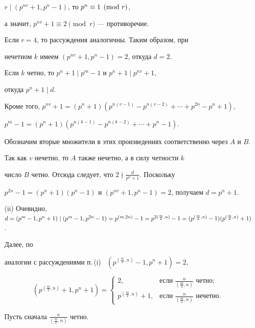 $r\mid(p^{nv}+1,p^n-1)$, то $p^n\equiv\linebreak 1\pmod r$,


а значит, $p^{nv}+1\equiv2\pmod r$ --- противоречие. 


Если $r=4$, то рассуждения аналогичны. Таким образом, при 


нечетном $k$ имеем $(p^{nv}+1,p^n-1)=2$, откуда $d=2$. 





Если $k$ четно, то $p^n+1\mid p^m-1$ и $p^n+1\mid p^{nv}+1$,


откуда $p^n+1\mid d$.


Кроме того, $p^{nv}+1=(p^n+1)(p^{n(v-1)}-p^{n(v-2)}+\dotsb+p^{2n}-p^n+1)$,


$p^m-1=(p^n+1)(p^{n(k-1)}-p^{n(k-2)}+\dotsb+p^n-1)$.


Обозначим вторые множители в этих произведениях соответственно через $A$ и $B$.


Так как $v$ нечетно, то $A$ также нечетно, а в силу четности $k$


число $B$ четно. Отсюда следует, что $2\nmid \frac{d}{p^n+1}$. Поскольку


$p^{2n}-1=(p^n+1)(p^n-1)$ и $(p^{nv}+1,p^n-1)=2$, получаем $d=p^n+1$.





(ii) Очевидно, $d=(p^m-1,p^n+1)\mid (p^m-1,p^{2n}-1)=p^{(m,2n)}-1=


p^{2(\frac m2,n)}-1=\linebreak(p^{(\frac m2,n)}-1)(p^{(\frac m2,n)}+1)$.


Далее, по 


аналогии с рассуждениями п.\,(i) \ $(p^{(\frac m2,n)}-1,p^n+1)=2$,


$$


(p^{(\frac m2,n)}+1,p^n+1)=


\begin{cases}


2, & \text{если $\frac{n}{(\frac m2,n)}$ четно;}\\


p^{(\frac m2,n)}+1, & \text{если $\frac{n}{(\frac m2,n)}$ нечетно.}


\end{cases}


$$





Пусть сначала $\frac{n}{(\frac m2,n)}$ четно. 


